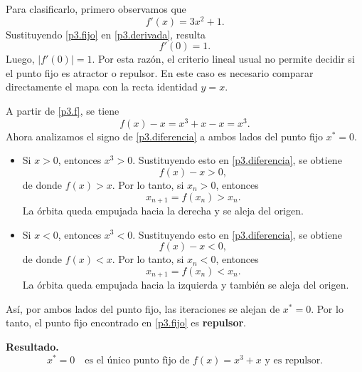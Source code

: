 \documentclass[12pt]{article}
\newcommand{\resultado}{\textbf{Resultado.}\enspace}
\begin{document}
Para clasificarlo, primero observamos que
\begin{equation}\label{p3.derivada}
    f'(x)=3x^2+1.
\end{equation}
Sustituyendo \eqref{p3.fijo} en \eqref{p3.derivada}, resulta
\begin{equation*}
    f'(0)=1.
\end{equation*}
Luego, $|f'(0)|=1$. Por esta razón, el criterio lineal usual no permite decidir si el punto fijo es atractor o repulsor. En este caso es necesario comparar directamente el mapa con la recta identidad $y=x$.

A partir de \eqref{p3.f}, se tiene
\begin{equation}\label{p3.diferencia}
    f(x)-x=x^3+x-x=x^3.
\end{equation}
Ahora analizamos el signo de \eqref{p3.diferencia} a ambos lados del punto fijo $x^*=0$.
\begin{itemize}
    \item Si $x>0$, entonces $x^3>0$. Sustituyendo esto en \eqref{p3.diferencia}, se obtiene
    \begin{equation*}
        f(x)-x>0,
    \end{equation*}
    de donde $f(x)>x$. Por lo tanto, si $x_n>0$, entonces
    \begin{equation*}
        x_{n+1}=f(x_n)>x_n.
    \end{equation*}
    La órbita queda empujada hacia la derecha y se aleja del origen.

    \item Si $x<0$, entonces $x^3<0$. Sustituyendo esto en \eqref{p3.diferencia}, se obtiene
    \begin{equation*}
        f(x)-x<0,
    \end{equation*}
    de donde $f(x)<x$. Por lo tanto, si $x_n<0$, entonces
    \begin{equation*}
        x_{n+1}=f(x_n)<x_n.
    \end{equation*}
    La órbita queda empujada hacia la izquierda y también se aleja del origen.
\end{itemize}

Así, por ambos lados del punto fijo, las iteraciones se alejan de $x^*=0$. Por lo tanto, el punto fijo encontrado en \eqref{p3.fijo} es \textbf{repulsor}.

\resultado
\begin{equation*}
    x^*=0\quad \text{es el único punto fijo de $f(x)=x^3+x$ y es repulsor.}
\end{equation*}
\end{document}

